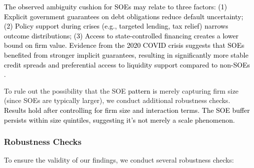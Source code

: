 \documentclass[preprint,12pt,authoryear]{elsarticle}
\begin{document}
 \textcolor{black}{The \textcolor{black}{observed} ambiguity cushion for SOEs \textcolor{black}{may relate to} three \textcolor{black}{factors}: (1) Explicit government guarantees on debt obligations reduce default uncertainty; (2) Policy support during crises (e.g., targeted lending, tax relief) narrows outcome distributions; (3) Access to state-controlled financing creates a lower bound on firm value. Evidence from the 2020 COVID crisis \textcolor{black}{suggests} that SOEs benefited from stronger implicit guarantees, resulting in significantly more stable credit spreads and preferential access to liquidity support compared to non-SOEs \citep{Geng2024}.}
  
  To rule out the possibility that the SOE \textcolor{black}{pattern} is merely capturing firm size (since SOEs are typically larger), we conduct additional robustness checks. \textcolor{black}{Results hold after controlling for firm size and interaction terms. The SOE buffer persists within size quintiles, suggesting it's not merely a scale \textcolor{black}{phenomenon}.}

\subsubsection{Robustness Checks}
\label{sec:robustness}

To ensure the validity of our findings, we conduct several robustness checks:
\end{document}
